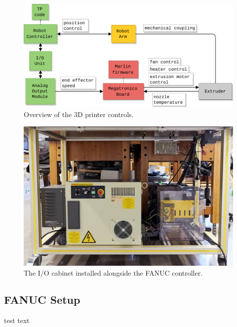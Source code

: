 \begin{figure}[t]
    \centering
    \includegraphics[width=.8\linewidth]{figures/diagrams/system overview}
    \caption{Overview of the 3D printer controls.}
    \label{fig:sys-overview}
\end{figure}

\begin{figure}[t]
    \centering
    \includegraphics[width=.8\linewidth]{figures/cabinet2}
    \caption{The I/O cabinet installed alongside the FANUC controller.}
    \label{fig:cabinet-2}
\end{figure}

\subsection*{FANUC Setup}

test text\\
